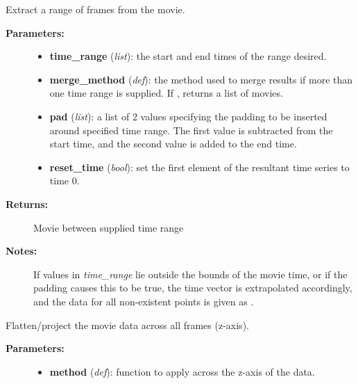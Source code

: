 \documentclass[letterpaper,10pt,english]{sphinxmanual}
\begin{document}
\begin{fulllineitems}
\begin{fulllineitems}
\begin{description}
\end{description}

\end{fulllineitems}


\begin{fulllineitems}
\label{data_structures:movies.Movie.take}
Extract a range of frames from the movie.
\begin{description}
\item[{\textbf{Parameters:}}] \leavevmode\begin{itemize}
\item {} 
\textbf{time\_range} (\emph{list}): the start and end times of the range desired.

\item {} 
\textbf{merge\_method} (\emph{def}): the method used to merge results if more than one time range is supplied. If , returns a list of movies.

\item {} 
\textbf{pad} (\emph{list}): a list of 2 values specifying the padding to be inserted around specified time range. The first value is subtracted from the start time, and the second value is added to the end time.

\item {} 
\textbf{reset\_time} (\emph{bool}): set the first element of the resultant time series to time 0.

\end{itemize}

\item[{\textbf{Returns:}}] \leavevmode
Movie between supplied time range

\item[{\textbf{Notes:}  }] \leavevmode
If values in \emph{time\_range} lie outside the bounds of the movie time, or if the padding causes this to be true, the time vector is extrapolated accordingly, and the data for all non-existent points is given as .

\end{description}

\end{fulllineitems}


\begin{fulllineitems}
\label{data_structures:movies.Movie.z_project}
Flatten/project the movie data across all frames (z-axis).
\begin{description}
\item[{\textbf{Parameters:}}] \leavevmode\begin{itemize}
\item {} 
\textbf{method} (\emph{def}): function to apply across the z-axis of the data.


\end{itemize}
\end{description}
\end{fulllineitems}
\end{fulllineitems}
\end{document}
